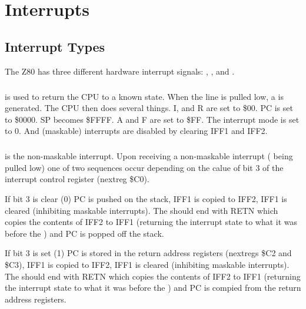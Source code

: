 \chapter{Interrupts}

\section{Interrupt Types}
The Z80 has three different hardware interrupt signals:
, , and .

\paragraph{}
 is used to return the CPU to a known state. When
the  line is pulled low, a  is
generated. The CPU then does several things. I, and R are set to \$00.
PC is set to \$0000. SP becomes \$FFFF. A and F are set to \$FF.  The
interrupt mode is set to 0. And (maskable) interrupts are disabled by
clearing IFF1 and IFF2.

\paragraph{}
 is the non-maskable interrupt. Upon receiving a
non-maskable interrupt ( being pulled low) one of
two sequences occur depending on the calue of bit 3 of the interrupt
control register (nextreg \$C0).



If bit 3 is clear (0) PC is pushed on the stack, IFF1 is copied to
IFF2, IFF1 is cleared (inhibiting maskable interrupts). The
 should end with RETN which copies the contents of
IFF2 to IFF1 (returning the interrupt state to what it was before the
) and PC is popped off the stack.

If bit 3 is set (1) PC is stored in the  return
address registers (nextregs \$C2 and \$C3), IFF1 is copied to IFF2,
IFF1 is cleared (inhibiting maskable interrupts). The
 should end with RETN which copies the contents of
IFF2 to IFF1 (returning the interrupt state to what it was before the
) and PC is compied from the 
return address registers.





